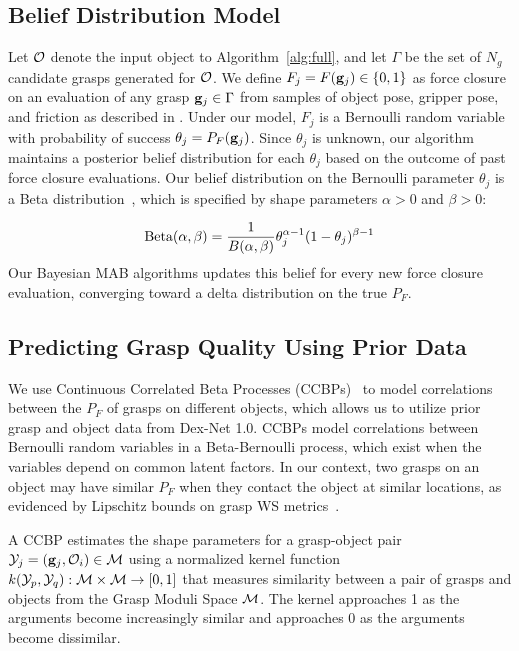 \subsection{Belief Distribution Model}
Let $\mathcal{O}$ denote the input object to Algorithm~\ref{alg:full}, and let $\Gamma$ be the set of $N_g$ candidate grasps generated for $\mathcal{O}$.
We define $F_{j} = F(\mathbf{g}_{j}) \in \{0, 1\}$ as force closure on an evaluation of any grasp $\mathbf{g}_{j} \in \Gamma$ from samples of object pose, gripper pose, and friction as described in .
Under our model, $F_j$ is a Bernoulli random variable with probability of success $\theta_{j}= P_F(\mathbf{g}_{j})$.
Since $\theta_j$ is unknown, our algorithm maintains a posterior belief distribution for each $\theta_j$ based on the outcome of past force closure evaluations.
Our belief distribution on the Bernoulli parameter $\theta_{j}$ is a Beta distribution~\cite{hoffman2013exploiting, laskey2015bandits}, which is specified by shape parameters $\alpha > 0$ and $\beta > 0$:

\vspace{-2ex}
\begin{align*}
	\text{Beta}(\alpha, \beta) = \frac{1}{B(\alpha, \beta)} \theta_j^{\alpha-1} (1 - \theta_j)^{\beta-1}
\end{align*}
\noindent Our Bayesian MAB algorithms updates this belief for every new force closure evaluation, converging toward a delta distribution on the true $P_F$. 

\subsection{Predicting Grasp Quality Using Prior Data}
We use Continuous Correlated Beta Processes (CCBPs)~\cite{goetschalckx2011continuous, montesano2012active} to model correlations between the $P_F$ of grasps on different objects, which allows us to utilize prior grasp and object data from Dex-Net 1.0.
CCBPs model correlations between Bernoulli random variables in a Beta-Bernoulli process, which exist when the variables depend on common latent factors.
In our context, two grasps on an object may have similar $P_F$ when they contact the object at similar locations, as evidenced by Lipschitz bounds on grasp WS metrics~\cite{pokorny2013c}.

A CCBP estimates the shape parameters for a grasp-object pair $\mathcal{Y}_{j} = (\mathbf{g}_{j}, \mathcal{O}_{i}) \in \mathcal{M}$ using a normalized kernel function $k(\mathcal{Y}_p, \mathcal{Y}_q) : \mathcal{M} \times \mathcal{M} \rightarrow [0,1]$ that measures similarity between a pair of grasps and objects from the Grasp Moduli Space $\mathcal{M}$.
The kernel approaches 1 as the arguments become increasingly similar and approaches 0 as the arguments become dissimilar.

